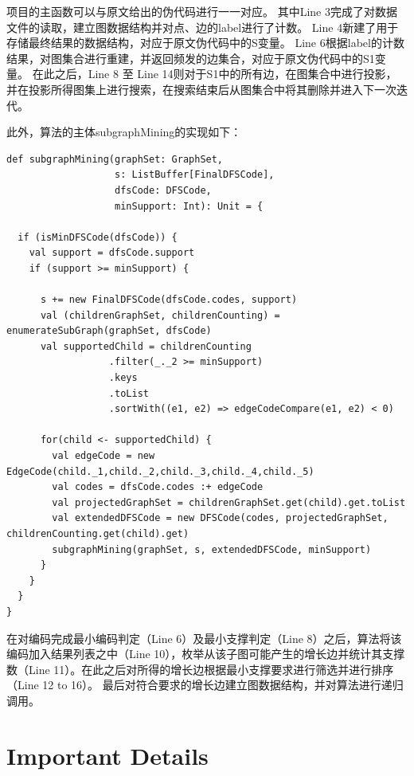 \documentclass{article}
\begin{document}
项目的主函数可以与原文给出的伪代码进行一一对应。
其中Line 3完成了对数据文件的读取，建立图数据结构并对点、边的label进行了计数。
Line 4新建了用于存储最终结果的数据结构，对应于原文伪代码中的S变量。
Line 6根据label的计数结果，对图集合进行重建，并返回频发的边集合，对应于原文伪代码中的S1变量。
在此之后，Line 8 至 Line 14则对于S1中的所有边，在图集合中进行投影，并在投影所得图集上进行搜索，在搜索结束后从图集合中将其删除并进入下一次迭代。

此外，算法的主体subgraphMining的实现如下：
\begin{lstlisting}[style=mStyle]
def subgraphMining(graphSet: GraphSet, 
                   s: ListBuffer[FinalDFSCode], 
                   dfsCode: DFSCode, 
                   minSupport: Int): Unit = {

  if (isMinDFSCode(dfsCode)) {
    val support = dfsCode.support
    if (support >= minSupport) {

      s += new FinalDFSCode(dfsCode.codes, support)
      val (childrenGraphSet, childrenCounting) = enumerateSubGraph(graphSet, dfsCode)
      val supportedChild = childrenCounting
                  .filter(_._2 >= minSupport)
                  .keys
                  .toList
                  .sortWith((e1, e2) => edgeCodeCompare(e1, e2) < 0)

      for(child <- supportedChild) {
        val edgeCode = new EdgeCode(child._1,child._2,child._3,child._4,child._5)
        val codes = dfsCode.codes :+ edgeCode
        val projectedGraphSet = childrenGraphSet.get(child).get.toList
        val extendedDFSCode = new DFSCode(codes, projectedGraphSet, childrenCounting.get(child).get)
        subgraphMining(graphSet, s, extendedDFSCode, minSupport)
      }
    }
  }
}
\end{lstlisting}

在对编码完成最小编码判定（Line 6）及最小支撑判定（Line 8）之后，算法将该编码加入结果列表之中（Line 10），枚举从该子图可能产生的增长边并统计其支撑数（Line 11）。在此之后对所得的增长边根据最小支撑要求进行筛选并进行排序（Line 12 to 16）。
最后对符合要求的增长边建立图数据结构，并对算法进行递归调用。

\section{Important Details}
\subsection{}
\subsection{}
\end{document}

